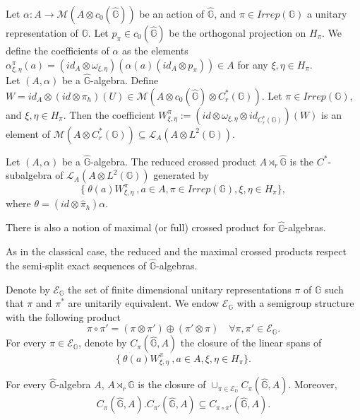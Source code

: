 Let $\alpha : A\rightarrow \mathcal M(A\otimes c_0(\hat{\mathbb G}))$ be an action of $\hat{\mathbb G}$, and $\pi\in Irrep(\mathbb G)$ a unitary representation of $\mathbb G$. Let $p_\pi\in c_0(\hat{\mathbb G}) $ be the orthogonal projection on $H_\pi$. We define the coefficients of $\alpha$ as the elements $\alpha^\pi_{\xi,\eta}(a) = ( id_A \otimes \omega_{\xi,\eta})(\alpha(a)( id _A\otimes p_\pi)) \in A$ for any $\xi,\eta\in H_\pi$.\\  

Let $(A,\alpha)$ be a $\hat{\mathbb G}$-algebra. Define $W= id_A \otimes (id\otimes\pi_h)(U) \in \mathcal M (A\otimes c_0(\hat{\mathbb G})\otimes C^*_r(\mathbb G))  $. Let $\pi\in Irrep(\mathbb G)$, and $\xi,\eta \in H_\pi$. Then the coefficient 
$W^\pi_{\xi,\eta}:=(id\otimes \omega_{\xi,\eta}\otimes id_{C^*_r(\mathbb G)})(W)$ is an element of $\mathcal M(A\otimes C_r^*(\mathbb G)) \subseteq \mathcal L_A(A\otimes L^2(\mathbb G))$. 

\begin{definition} Let $(A,\alpha)$ be a $\hat{\mathbb G}$-algebra. The reduced crossed product $A\rtimes_r \hat{\mathbb G}$ is the $C^*$-subalgebra of $\mathcal L_A(A\otimes L^2(\mathbb G))$ generated by 
\[\{\ \theta(a)W^\pi_{\xi,\eta}\ , a\in A , \pi\in Irrep(\mathbb G),\xi,\eta\in H_\pi\},\]
where $\theta = ( id \otimes  \hat\pi_h)\alpha$.  
\end{definition}

\begin{rk}
There is also a notion of maximal (or full) crossed product for $\hat{\mathbb G}$-algebras.
\end{rk}

\begin{rk}
As in the classical case, the reduced and the maximal crossed products respect the semi-split exact sequences of $\hat{\mathbb G}$-algebras.
\end{rk}

Denote by $\mathcal E_{\mathbb G}$ the set of finite dimensional unitary representations $\pi$ of $\mathbb G$ such that $\pi$ and $\pi^*$ are unitarily equivalent. We endow $\mathcal E_{\mathbb G}$ with a semigroup structure with the following product 
\[\pi\circ \pi' = (\pi\otimes\pi')\oplus (\pi'\otimes \pi)\quad \forall \pi,\pi'\in \mathcal E_{\mathbb G}.\]
For every $\pi\in \mathcal E_{\mathbb G}$, denote by $C_\pi(\hat{\mathbb G}, A)$ the closure of the linear spans of 
\[\{\ \theta(a) W_{\xi,\eta}^\pi \ ,a\in A, \xi,\eta\in H_\pi\}.\]

\begin{prop} \label{filtrationQG}
For every $\hat{\mathbb G}$-algebra $A$, $A\rtimes_r \hat{\mathbb G}$ is the closure of $\cup_{\pi\in \mathcal E_{\mathbb G}} C_\pi(\hat{\mathbb G}, A)$. Moreover,
\[C_\pi(\hat{\mathbb G}, A).C_{\pi'}(\hat{\mathbb G}, A) \subseteq C_{\pi \circ \pi'}(\hat{\mathbb G}, A).\]
\end{prop}


